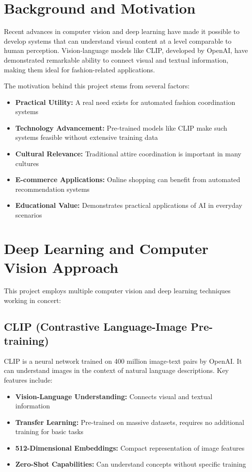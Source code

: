 \documentclass[12pt,a4paper]{report}
\begin{document}
\section{Background and Motivation}

Recent advances in computer vision and deep learning have made it possible to develop systems that can understand visual content at a level comparable to human perception. Vision-language models like CLIP, developed by OpenAI, have demonstrated remarkable ability to connect visual and textual information, making them ideal for fashion-related applications.

The motivation behind this project stems from several factors:

\begin{itemize}
    \item \textbf{Practical Utility:} A real need exists for automated fashion coordination systems
    \item \textbf{Technology Advancement:} Pre-trained models like CLIP make such systems feasible without extensive training data
    \item \textbf{Cultural Relevance:} Traditional attire coordination is important in many cultures
    \item \textbf{E-commerce Applications:} Online shopping can benefit from automated recommendation systems
    \item \textbf{Educational Value:} Demonstrates practical applications of AI in everyday scenarios
\end{itemize}

\section{Deep Learning and Computer Vision Approach}

This project employs multiple computer vision and deep learning techniques working in concert:

\subsection{CLIP (Contrastive Language-Image Pre-training)}

CLIP is a neural network trained on 400 million image-text pairs by OpenAI. It can understand images in the context of natural language descriptions. Key features include:

\begin{itemize}
    \item \textbf{Vision-Language Understanding:} Connects visual and textual information
    \item \textbf{Transfer Learning:} Pre-trained on massive datasets, requires no additional training for basic tasks
    \item \textbf{512-Dimensional Embeddings:} Compact representation of image features
    \item \textbf{Zero-Shot Capabilities:} Can understand concepts without specific training
\end{itemize}
\end{document}
